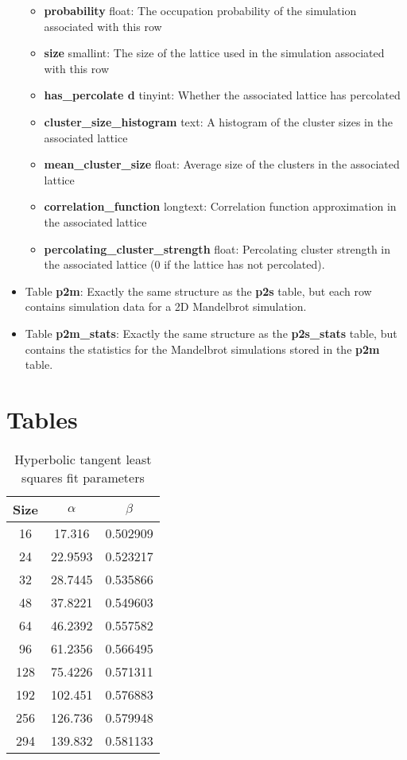 \begin{itemize}
\begin{itemize}
        \item \textbf{probability} float: The occupation probability of the simulation associated with this row
        \item \textbf{size} smallint: The size of the lattice used in the simulation associated with this row
        \item \textbf{has\_percolate d} tinyint: Whether the associated lattice has percolated
        \item \textbf{cluster\_size\_histogram} text: A histogram of the cluster sizes in the associated lattice
        \item \textbf{mean\_cluster\_size} float: Average size of the clusters in the associated lattice
        \item \textbf{correlation\_function} longtext: Correlation function approximation in the associated lattice
        \item \textbf{percolating\_cluster\_strength} float: Percolating cluster strength in the associated lattice (0 if the lattice has not percolated).
    \end{itemize}    
    \item Table \textbf{p2m}: Exactly the same structure as the \textbf{p2s} table, but each row contains simulation data for a 2D Mandelbrot simulation.
    \item Table \textbf{p2m\_stats}: Exactly the same structure as the \textbf{p2s\_stats} table, but contains the statistics for the Mandelbrot simulations stored in the \textbf{p2m} table.
    
\end{itemize}

\clearpage
\clearpage
\chapter{Tables}
\begin{table}[H]
\begin{center}
    \begin{tabular}{||c | c |  c|| }
    \hline
      Size &   $\alpha$ &   $\beta$ \\
    \hline
      16 &    17.316  &  0.502909 \\
      24 &    22.9593 &  0.523217 \\
      32 &    28.7445 &  0.535866 \\
      48 &    37.8221 &  0.549603 \\
      64 &    46.2392 &  0.557582 \\
      96 &    61.2356 &  0.566495 \\
     128 &    75.4226 &  0.571311 \\
     192 &   102.451  &  0.576883 \\
     256 &   126.736  &  0.579948 \\
     294 &   139.832  &  0.581133 \\
    \hline
    \end{tabular}
\end{center}
\caption{Hyperbolic tangent least squares fit parameters}
\label{table:sec3_tahn_fit_parameters}
\end{table}



